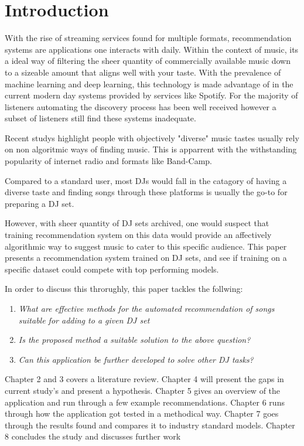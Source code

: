 
\graphicspath{{Chapter1/}}


\chapter{Introduction}
With the rise of streaming services found for multiple formats, recommendation systems are applications one interacts with daily. Within the context of music, its a ideal way of filtering the sheer quantity of commercially available music down to a sizeable amount that aligns well with your taste. With the prevalence of machine learning and deep learning, this technology is made advantage of in the current modern day systems provided by services like Spotify. For the majority of listeners automating the discovery process has been well received however a subset of listeners still find these systems inadequate.

Recent studys highlight people with objectively "diverse" music tastes usually rely on non algoritmic ways of finding music. This is apparrent with the withstanding popularity of internet radio and formats like Band-Camp. 

Compared to a standard user, most DJs would fall in the catagory of having a diverse taste and finding songs through these platforms is usually the go-to for preparing a DJ set.

However, with sheer quantity of DJ sets archived, one would suspect that training recommendation system on this data would provide an affectively algorithmic way to suggest music to cater to this specific audience. This paper presents a recommendation system trained on DJ sets, and see if training on a specific dataset could compete with top performing models.

In order to discuss this throrughly, this paper tackles the follwing:

\begin{enumerate}
	\item \textit{What are effective methods for the automated recommendation of songs suitable
		for adding to a given DJ set}
	\item \textit{Is the proposed method a suitable solution to the above question?}
	\item \textit{Can this application be further developed to solve other DJ tasks?}
\end{enumerate}

Chapter 2 and 3 covers a literature review. Chapter 4 will present the gaps in current study's and present a hypothesis. Chapter 5 gives an overview of the application and run through a few example recommendations. Chapter 6 runs through how the application got tested in a methodical way. Chapter 7 goes through the results found and compares it to industry standard models. Chapter 8 concludes the study and discusses further work 
 